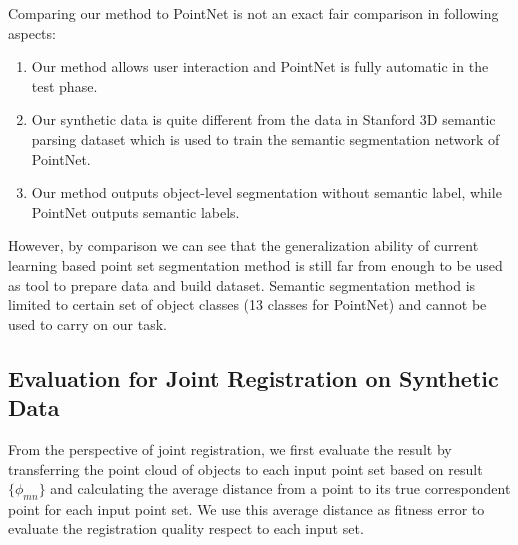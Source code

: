 %
Comparing our method to PointNet is not an exact fair comparison in following aspects:
\begin{enumerate}
\item Our method allows user interaction and PointNet is fully automatic in the test phase.
\item Our synthetic data is quite different from the data in Stanford 3D semantic parsing dataset\cite{semsegdataset} which is used to train the semantic segmentation network of PointNet.
\item Our method outputs object-level segmentation without semantic label, while PointNet outputs semantic labels.  
\end{enumerate}
However, by comparison we can see that the generalization ability of current learning based point set segmentation method is still far from enough to be used as tool to prepare data and build dataset. Semantic segmentation method is limited to certain set of object classes (13 classes for PointNet) and cannot be used to carry on our task. 
\subsection{Evaluation for Joint Registration on Synthetic Data}
From the perspective of joint registration, we first evaluate the result by transferring the point cloud of objects to each input point set based on result $\{\phi_{mn}\}$ and calculating the average distance from a point to its true correspondent point for each input point set.
We use this average distance as fitness error to evaluate the registration quality respect to each input set.

